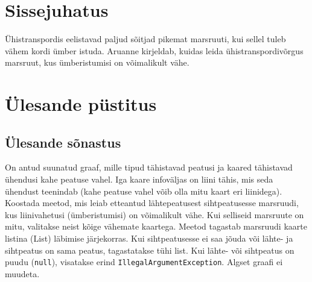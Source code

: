 \documentclass[12pt,a4paper,oneside]{report}
\newcommand{\code}[1]{\texttt{#1}}
\theoremstyle{definition}
\theoremstyle{plain}
\begin{document}


\setcounter{page}{2}
\tableofcontents
\clearpage
{}

\chapter*{Sissejuhatus}

Ühistranspordis eelistavad paljud sõitjad pikemat marsruuti, kui sellel
tuleb vähem kordi ümber istuda. Aruanne kirjeldab, kuidas leida
ühistranspordivõrgus marsruut, kus ümberistumisi on võimalikult vähe.

\chapter{Ülesande püstitus}
\label{ch:pustitus}

\section{Ülesande sõnastus}
On antud suunatud graaf, mille tipud tähistavad peatusi ja kaared tähistavad ühendusi kahe peatuse vahel.
Iga kaare infoväljas on liini tähis, mis seda ühendust teenindab (kahe peatuse vahel võib olla mitu kaart eri liinidega).
Koostada meetod, mis leiab etteantud lähtepeatusest sihtpeatusesse marsruudi, kus liinivahetusi (ümberistumisi) on võimalikult vähe.
Kui selliseid marsruute on mitu, valitakse neist kõige vähemate kaartega.
Meetod tagastab marsruudi kaarte listina (List) läbimise järjekorras.
Kui sihtpeatusesse ei saa jõuda või lähte- ja sihtpeatus on sama peatus,
tagastatakse tühi list.
Kui lähte- või sihtpeatus on puudu (\code{null}), visatakse erind
\code{IllegalArgumentException}.
Algset graafi ei muudeta.
\end{document}
